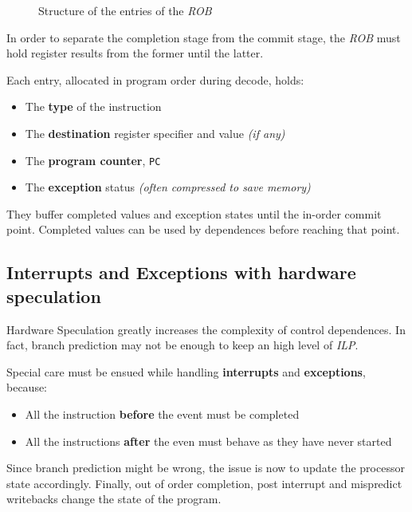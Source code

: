 \documentclass[english]{article}
\begin{document}
\begin{figure}[htbp]
  \bigskip
  \centering
  \caption{Structure of the entries of the \textit{ROB}}
  \label{fig:structure-entries-rob}
  \bigskip
\end{figure}

\bigskip
In order to separate the completion stage from the commit stage, the \textit{ROB} must hold register results from the former until the latter.

Each entry, allocated in program order during decode, holds:

\begin{itemize}
  \item The \textbf{type} of the instruction
  \item The \textbf{destination} register specifier and value \textit{(if any)}
  \item The \textbf{program counter}, \texttt{PC}
  \item The \textbf{exception} status \textit{(often compressed to save memory)}
\end{itemize}

They buffer completed values and exception states until the in-order commit point.
Completed values can be used by  dependences before reaching that point.

\subsection{Interrupts and Exceptions with hardware speculation}

Hardware Speculation greatly increases the complexity of control  dependences.
In fact, branch prediction may not be enough to keep an high level of \textit{ILP}.

Special care must be ensued while handling \textbf{interrupts} and \textbf{exceptions}, because:

\begin{itemize}
  \item All the instruction \textbf{before} the event must be completed
  \item All the instructions \textbf{after} the even must behave as they have never started
\end{itemize}

Since branch prediction might be wrong, the issue is now to update the processor state accordingly.
Finally, out of order completion, post interrupt and mispredict writebacks change the state of the program.
\end{document}
